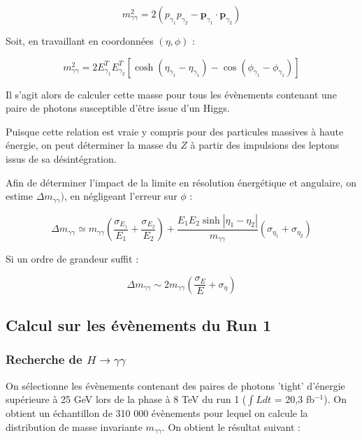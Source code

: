\documentclass[11pt]{article} %
\begin{document}
\begin{equation}
m_{\gamma \gamma}^2 = 2 \left ( p_{\gamma_1} p_{\gamma_2} - \textbf{p}_{\gamma_1} \cdot \textbf{p}_{\gamma_2} \right )
\end{equation}

Soit, en travaillant en coordonnées $(\eta, \phi)$ :

\begin{equation}
m_{\gamma \gamma}^2 = 2 E_{\gamma_1}^T E_{\gamma_2}^T \left [ \cosh {\left( \eta_{\gamma_1} - \eta_{\gamma_1} \right)} - \cos{\left( \phi_{\gamma_1} - \phi_{\gamma_1} \right)} \right ]
\end{equation}

Il s'agit alors de calculer cette masse pour tous les évènements contenant une paire de photons susceptible d'être issue d'un Higgs. 

Puisque cette relation est vraie y compris pour des particules massives à haute énergie, on peut déterminer la masse du $Z$ à partir des impulsions des leptons issus de sa désintégration.

Afin  de déterminer l'impact de la limite en résolution énergétique et angulaire, on estime $\Delta m_{\gamma\gamma})$, en négligeant l'erreur sur $\phi$ :

\begin{equation}
\Delta m_{\gamma\gamma} \simeq m_{\gamma \gamma}\left( \dfrac{\sigma_{E_1}}{E_1} +  \dfrac{\sigma_{E_2}}{E_2}\right) + \dfrac{E_1E_2 \sinh {|\eta_1 - \eta_2|}}{m_{\gamma \gamma}} \left( \sigma_{\eta_1} + \sigma_{\eta_2} \right)
\end{equation}

Si un ordre de grandeur suffit :

\begin{equation}
\Delta m_{\gamma\gamma} \sim 2m_{\gamma \gamma}\left ( \dfrac{\sigma_E}{E} +  \sigma_{\eta} \right )
\end{equation}

\subsection{Calcul sur les évènements du Run 1}

\subsubsection{Recherche de $H \to \gamma\gamma$}

On sélectionne les évènements contenant des paires de photons 'tight' d'énergie supérieure à 25 GeV lors de la phase à 8 TeV du run 1 ($\int L dt$ = 20,3 fb$^{-1}$).
On obtient un échantillon de 310 000 évènements pour lequel on calcule la distribution de masse invariante $m_{\gamma \gamma}$. On obtient le résultat suivant :
\end{document}
